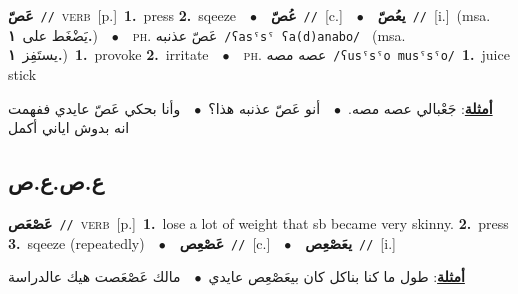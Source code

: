 \documentclass[10pt,a4paper,twoside]{article} %
\begin{document}
\begin{multicols}{2}
{\setlength\topsep{0pt}\textbf{\foreignlanguage{arabic}{عَصّ}}\ {\color{gray}\texttt{//}\color{black}}\ \textsc{verb}\ [p.]\ \textbf{1.}~press  \textbf{2.}~sqeeze\ \ $\bullet$\ \ \setlength\topsep{0pt}\textbf{\foreignlanguage{arabic}{عُصّ}}\ {\color{gray}\texttt{//}\color{black}}\ [c.]\ \ $\bullet$\ \ \setlength\topsep{0pt}\textbf{\foreignlanguage{arabic}{يعُصّ}}\ {\color{gray}\texttt{//}\color{black}}\ [i.]\ \color{gray}(msa. \foreignlanguage{arabic}{يَضْغَط على}~\foreignlanguage{arabic}{\textbf{١.}})\color{black}\ \ $\bullet$\ \ \textsc{ph.} \color{gray} \foreignlanguage{arabic}{عَصّ عذنبه}\color{black}\ {\color{gray}\texttt{/{\sffamily ʕasˤsˤ ʕa(d)anabo}/}\color{black}}\ \color{gray} (msa. \foreignlanguage{arabic}{يستَفِز}~\foreignlanguage{arabic}{\textbf{١.}})\color{black}\ \textbf{1.}~provoke  \textbf{2.}~irritate\ \ $\bullet$\ \ \textsc{ph.} \color{gray} \foreignlanguage{arabic}{عصه مصه}\color{black}\ {\color{gray}\texttt{/{\sffamily ʕusˤsˤo musˤsˤo}/}\color{black}}\ \textbf{1.}~juice stick\  \begin{flushright}\color{gray}\foreignlanguage{arabic}{\textbf{\underline{\foreignlanguage{arabic}{أمثلة}}}: جَعْبالي عصه مصه.\ $\bullet$\ \  أنو عَصّ عذنبه هذا؟\ $\bullet$\ \  وأنا بحكي عَصّ عايدي ففهمت انه بدوش اياني أكمل}\end{flushright}\color{black}} \vspace{2mm}

\vspace{-3mm}
\subsection*{\color{blue}\foreignlanguage{arabic}{ع.ص.ع.ص}\color{blue}{}} 

{\setlength\topsep{0pt}\textbf{\foreignlanguage{arabic}{عَصْعَص}}\ {\color{gray}\texttt{//}\color{black}}\ \textsc{verb}\ [p.]\ \textbf{1.}~lose a lot of weight that sb became very skinny.  \textbf{2.}~press  \textbf{3.}~sqeeze (repeatedly)\ \ $\bullet$\ \ \setlength\topsep{0pt}\textbf{\foreignlanguage{arabic}{عَصْعِص}}\ {\color{gray}\texttt{//}\color{black}}\ [c.]\ \ $\bullet$\ \ \setlength\topsep{0pt}\textbf{\foreignlanguage{arabic}{يعَصْعِص}}\ {\color{gray}\texttt{//}\color{black}}\ [i.]\  \begin{flushright}\color{gray}\foreignlanguage{arabic}{\textbf{\underline{\foreignlanguage{arabic}{أمثلة}}}: طول ما كنا بناكل كان بيعَصْعِص عايدي\ $\bullet$\ \  مالك عَصْعَصت هيك عالدراسة}\end{flushright}\color{black}} \vspace{2mm}


\end{multicols}
\end{document}

